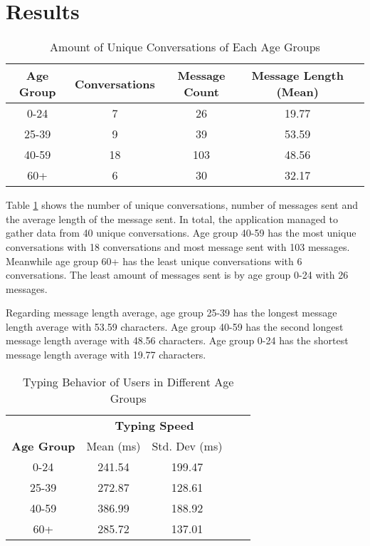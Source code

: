 \section{Results}


\begin{table}[h]
    \centering
    \begin{tabular}{ccccc}
    \toprule
    \textbf{Age Group} & {Conversations} & Message Count & Message Length (Mean) \\
    \midrule
    0-24     & 7 & 26 & 19.77 \\
    25-39    & 9 & 39 & 53.59\\
    40-59    & 18 & 103 & 48.56\\
    60+      & 6 & 30 & 32.17 \\
    \bottomrule
    \end{tabular}
    \caption{Amount of Unique Conversations of Each Age Groups}
    \label{tab:unique_conversations}
\end{table}

Table \ref{tab:unique_conversations} shows the number of unique conversations, number of messages sent and the average length of the message sent.
In total, the application managed to gather data from 40 unique conversations.
Age group 40-59 has the most unique conversations with 18 conversations and most message sent with 103 messages.
Meanwhile age group 60+ has the least unique conversations with 6 conversations.
The least amount of messages sent is by age group 0-24 with 26 messages.

Regarding message length average, age group 25-39 has the longest message length average with 53.59 characters.
Age group 40-59 has the second longest message length average with 48.56 characters.
Age group 0-24 has the shortest message length average with 19.77 characters.


\begin{table}[h]
    \centering
    \begin{tabular}{ccccc}
    \toprule
    \multicolumn{1}{c}{} & \multicolumn{2}{c}{\textbf{Typing Speed}}\\
    \cmidrule(rl){2-3} \cmidrule(rl){4-5}
    \textbf{Age Group} & {Mean (ms)} & {Std. Dev (ms)} \\
    \midrule
    0-24 & 241.54 & 199.47 \\
    25-39 & 272.87 & 128.61  \\
    40-59 & 386.99 & 188.92 \\
    60+ & 285.72 & 137.01 \\
    \bottomrule
    \end{tabular}
    \caption{Typing Behavior of Users in Different Age Groups}
    \label{tab:typing_behavior}
\end{table}

